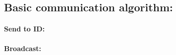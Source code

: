 \documentclass[10pt,a4paper]{article}
\begin{document}
				
				
		\subsection{Basic communication algorithm:}
			
			\paragraph{Send to ID:}
			
			\paragraph{Broadcast:}
			
\end{document}
